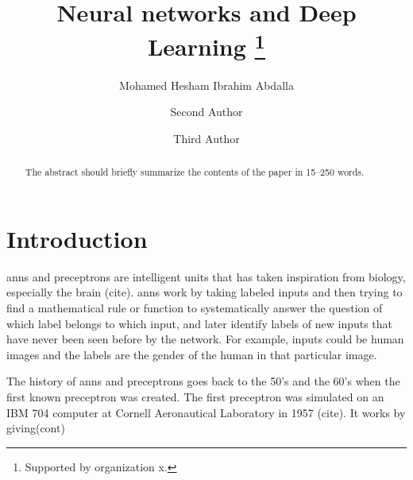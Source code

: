 \documentclass[runningheads]{llncs}
\begin{document}
%
\title{Neural networks and Deep Learning \thanks{Supported by organization x.}}
%
%
\author{Mohamed Hesham Ibrahim Abdalla \and
Second Author \and
Third Author}
%
%
%
\maketitle              %
%
\begin{abstract}
The abstract should briefly summarize the contents of the paper in
15--250 words.

\end{abstract}
%
%
%
\section{Introduction}

\gls{anns} and preceptrons are intelligent units that has taken inspiration
from biology, especially the brain (cite). \gls{anns} work by taking labeled inputs
and then trying to find a mathematical rule or function to systematically answer the question
of which label belongs to which input, and later identify labels of new inputs that have never been seen before by the network. For example, inputs could be human images and the labels are 
the gender of the human in that particular image.

The history of \gls{anns} and preceptrons goes back to the 50's and the 60's when 
the first known preceptron was created. The first preceptron was simulated on an IBM 704 computer at Cornell Aeronautical Laboratory in 1957 (cite).  It works by giving(cont)
\end{document}
